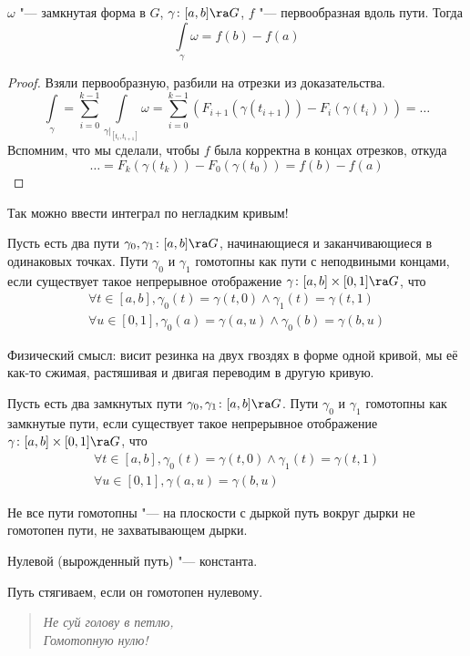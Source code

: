 \begin{conseq}
	$\omega$ "--- замкнутая форма в $G$, $\gamma\colon [a, b] \ra G$, $f$ "--- первообразная вдоль пути.
	Тогда
	\[ \int\limits_\gamma \omega = f(b) - f(a) \]
\end{conseq}
\begin{proof}
	Взяли первообразную, разбили на отрезки из доказательства.
	\[
		\int\limits_\gamma
		= \sum_{i=0}^{k-1} \int\limits_{\gamma|_{[t_i,t_{i+1}]}} \omega
		= \sum_{i=0}^{k-1} \left( F_{i+1}(\gamma(t_{i+1})) - F_i(\gamma(t_i)) \right)
		= \dots
	\]
	Вспомним, что мы сделали, чтобы $f$ была корректна в концах отрезков, откуда
	\[
		\dots
		= F_k(\gamma(t_k)) - F_0(\gamma(t_0))
		= f(b) - f(a)
	\]
\end{proof}

\begin{Rem}
	Так можно ввести интеграл по негладким кривым!
\end{Rem}

\begin{Def}
	Пусть есть два пути $\gamma_0, \gamma_1\colon [a,b] \ra G$, начинающиеся и заканчивающиеся в одинаковых точках.
	Пути $\gamma_0$ и $\gamma_1$ гомотопны как пути с неподвиными концами, если существует такое непрерывное отображение
	$\gamma\colon [a,b] \times [0,1] \ra G$, что
	\begin{gather*}
		\forall t \in [a, b], \gamma_0(t) = \gamma(t, 0) \land \gamma_1(t) = \gamma(t, 1) \\
		\forall u \in [0, 1], \gamma_0(a) = \gamma(a, u) \land \gamma_0(b) = \gamma(b, u)
	\end{gather*}
\end{Def}

Физический смысл: висит резинка на двух гвоздях в форме одной кривой, мы её как-то сжимая, растяшивая и двигая переводим в другую кривую.

\begin{Def}
	Пусть есть два замкнутых пути $\gamma_0, \gamma_1\colon [a,b] \ra G$.
	Пути $\gamma_0$ и $\gamma_1$ гомотопны как замкнутые пути, если существует такое непрерывное отображение
	$\gamma\colon [a,b] \times [0,1] \ra G$, что
	\begin{gather*}
		\forall t \in [a, b], \gamma_0(t) = \gamma(t, 0) \land \gamma_1(t) = \gamma(t, 1) \\
		\forall u \in [0, 1], \gamma(a, u) = \gamma(b, u)
	\end{gather*}
\end{Def}

Не все пути гомотопны "--- на плоскости с дыркой путь вокруг дырки не гомотопен пути, не захватывающем дырки.

\begin{Def}
	Нулевой (вырожденный путь) "--- константа.
\end{Def}

\begin{Def}
	Путь стягиваем, если он гомотопен нулевому.
\end{Def}

\begin{Rem}\hfill\begin{verse}\it
	Не суй голову в петлю, \\
	Гомотопную нулю!
\end{verse}\end{Rem}
